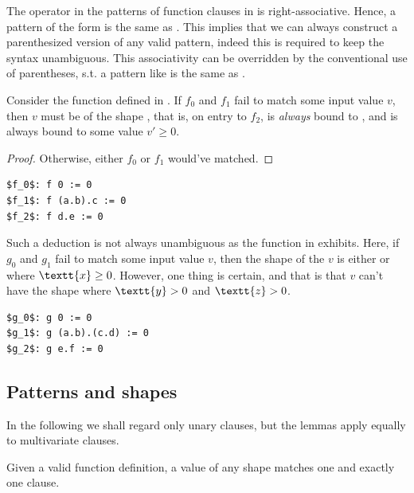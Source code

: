 The  operator in the patterns of function clauses in \D{} is
right-associative. Hence, a pattern of the form  is the same as
. This implies that we can always construct a parenthesized
version of any valid pattern, indeed this is required to keep the syntax
unambiguous. This associativity can be overridden by the conventional use of
parentheses, s.t. a pattern like  is the same as
. 

Consider the function defined in . If $f_0$ and
$f_1$ fail to match some input value $v$, then $v$ must be of the shape
, that is, on entry to $f_2$,  is \emph{always} bound to
, and  is always bound to some value $v'\geq 0$.

\begin{proof} Otherwise, either $f_0$ or $f_1$ would've matched. \end{proof}

\begin{lstlisting}[label=listing:deducing-zero,
  caption={A sample program for showing 0-deduction.}]
$f_0$: f 0 := 0
$f_1$: f (a.b).c := 0
$f_2$: f d.e := 0
\end{lstlisting}

Such a deduction is not always unambiguous as the function in
 exhibits. Here, if $g_0$ and $g_1$ fail to
match some input value $v$, then the shape of the $v$ is either  or
 where $\textt{x}\geq 0$. However, one thing is certain, and that is
that $v$ can't have the shape  where $\textt{y}>0$ and $\textt{z}>0$.

\begin{lstlisting}[label=listing:deducing-zero-fail,
  caption={A sample program where 0-deduction is ambiguous.}]
$g_0$: g 0 := 0
$g_1$: g (a.b).(c.d) := 0
$g_2$: g e.f := 0
\end{lstlisting}

\subsection{Patterns and shapes}

In the following we shall regard only unary clauses, but the lemmas apply
equally to multivariate clauses.

\begin{lemma} Given a valid function definition, a value of any shape matches
one and exactly one clause. \end{lemma}

